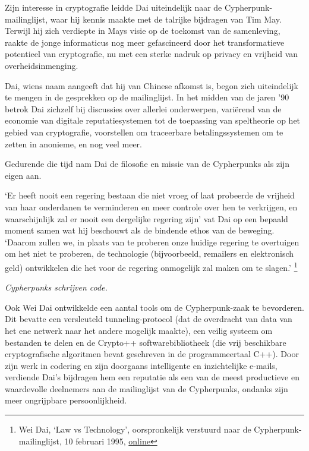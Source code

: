 \documentclass[
  a5paper,
  smalldemyvopaper,11pt,twoside,onecolumn,openright,extrafontsizes]{memoir}
\begin{document}
Zijn interesse in cryptografie leidde Dai uiteindelijk naar de
Cypherpunk-mailinglijst, waar hij kennis maakte met de talrijke
bijdragen van Tim May. Terwijl hij zich verdiepte in Mays visie op de
toekomst van de samenleving, raakte de jonge informaticus nog meer
gefascineerd door het transformatieve potentieel van cryptografie, nu
met een sterke nadruk op privacy en vrijheid van overheidsinmenging.

Dai, wiens naam aangeeft dat hij van Chinese afkomst is, begon zich
uiteindelijk te mengen in de gesprekken op de mailinglijst. In het
midden van de jaren '90 betrok Dai zichzelf bij discussies over allerlei
onderwerpen, variërend van de economie van digitale reputatiesystemen
tot de toepassing van speltheorie op het gebied van cryptografie,
voorstellen om traceerbare betalingssystemen om te zetten in anonieme,
en nog veel meer.

Gedurende die tijd nam Dai de filosofie en missie van de Cypherpunks als
zijn eigen aan.

`Er heeft nooit een regering bestaan die niet vroeg of laat probeerde de
vrijheid van haar onderdanen te verminderen en meer controle over hen te
verkrijgen, en waarschijnlijk zal er nooit een dergelijke regering zijn'
vat Dai op een bepaald moment samen wat hij beschouwt als de bindende
ethos van de beweging. `Daarom zullen we, in plaats van te proberen onze
huidige regering te overtuigen om het niet te proberen, de technologie
(bijvoorbeeld, remailers en elektronisch geld) ontwikkelen die het voor
de regering onmogelijk zal maken om te slagen.' \footnote{Wei Dai, `Law
  vs Technology', oorspronkelijk verstuurd naar de
  Cypherpunk-mailinglijst, 10 februari 1995,
  \href{https://cypherpunks.venona.com/date/1995/02/msg00508.html}{online}}

\emph{Cypherpunks schrijven code.}

Ook Wei Dai ontwikkelde een aantal tools om de Cypherpunk-zaak te
bevorderen. Dit bevatte een versleuteld tunneling-protocol (dat de
overdracht van data van het ene netwerk naar het andere mogelijk
maakte), een veilig systeem om bestanden te delen en de Crypto++
softwarebibliotheek (die vrij beschikbare cryptografische algoritmen
bevat geschreven in de programmeertaal C++). Door zijn werk in codering
en zijn doorgaans intelligente en inzichtelijke e-mails, verdiende Dai's
bijdragen hem een reputatie als een van de meest productieve en
waardevolle deelnemers aan de mailinglijst van de Cypherpunks, ondanks
zijn meer ongrijpbare persoonlijkheid.
\end{document}
